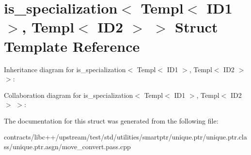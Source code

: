 \hypertarget{structis__specialization_3_01_templ_3_01_i_d1_01_4_00_01_templ_3_01_i_d2_01_4_01_4}{}\section{is\+\_\+specialization$<$ Templ$<$ I\+D1 $>$, Templ$<$ I\+D2 $>$ $>$ Struct Template Reference}
\label{structis__specialization_3_01_templ_3_01_i_d1_01_4_00_01_templ_3_01_i_d2_01_4_01_4}


Inheritance diagram for is\+\_\+specialization$<$ Templ$<$ I\+D1 $>$, Templ$<$ I\+D2 $>$ $>$\+:


Collaboration diagram for is\+\_\+specialization$<$ Templ$<$ I\+D1 $>$, Templ$<$ I\+D2 $>$ $>$\+:


The documentation for this struct was generated from the following file\+:\begin{DoxyCompactItemize}
\item 
contracts/libc++/upstream/test/std/utilities/smartptr/unique.\+ptr/unique.\+ptr.\+class/unique.\+ptr.\+asgn/move\+\_\+convert.\+pass.\+cpp\end{DoxyCompactItemize}
